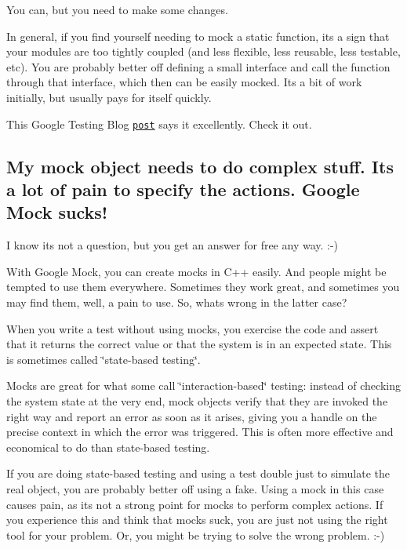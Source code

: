 You can, but you need to make some changes.

In general, if you find yourself needing to mock a static function, it\textquotesingle{}s a sign that your modules are too tightly coupled (and less flexible, less reusable, less testable, etc). You are probably better off defining a small interface and call the function through that interface, which then can be easily mocked. It\textquotesingle{}s a bit of work initially, but usually pays for itself quickly.

This Google Testing Blog \href{http://googletesting.blogspot.com/2008/06/defeat-static-cling.html}{\tt post} says it excellently. Check it out.

\subsection*{My mock object needs to do complex stuff. It\textquotesingle{}s a lot of pain to specify the actions. Google Mock sucks!}

I know it\textquotesingle{}s not a question, but you get an answer for free any way. \+:-\/)

With Google Mock, you can create mocks in C++ easily. And people might be tempted to use them everywhere. Sometimes they work great, and sometimes you may find them, well, a pain to use. So, what\textquotesingle{}s wrong in the latter case?

When you write a test without using mocks, you exercise the code and assert that it returns the correct value or that the system is in an expected state. This is sometimes called \char`\"{}state-\/based testing\char`\"{}.

Mocks are great for what some call \char`\"{}interaction-\/based\char`\"{} testing\+: instead of checking the system state at the very end, mock objects verify that they are invoked the right way and report an error as soon as it arises, giving you a handle on the precise context in which the error was triggered. This is often more effective and economical to do than state-\/based testing.

If you are doing state-\/based testing and using a test double just to simulate the real object, you are probably better off using a fake. Using a mock in this case causes pain, as it\textquotesingle{}s not a strong point for mocks to perform complex actions. If you experience this and think that mocks suck, you are just not using the right tool for your problem. Or, you might be trying to solve the wrong problem. \+:-\/)

